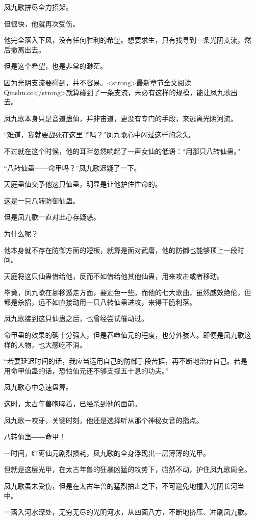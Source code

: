 \begin{this_body}
凤九歌拼尽全力招架。

但很快，他就再次受伤。

他完全落入下风，没有任何胜利的希望。想要求生，只有找寻到一条光阴支流，然后撤离出去。

但是这个希望，也是非常的渺茫。

因为光阴支流要碰到，并不容易。<strong>最新章节全文阅读Qiushu.cc</strong>就算碰到了一条支流，未必有这样的规模，能让凤九歌出去。

凤九歌本身只是音道蛊仙，并非宙道，更没有专门的手段，来逃离光阴河流。

“难道，我就要战死在这里了吗？”凤九歌心中闪过这样的念头。

不过就在这个时候，他的耳畔忽然响起了一声女仙的低语：“用那只八转仙蛊。”

“八转仙蛊――命甲吗？”凤九歌迟疑了一下。

天庭蛊仙交予他这只仙蛊，明显是让他护住性命的。

这是一只八转防御仙蛊。

但是凤九歌一直对此心存疑惑。

为什么呢？

他本身就不存在防御方面的短板，就算是面对武庸，他的防御也能够顶上一段时间。

天庭将这只仙蛊借给他，反而不如借给他其他仙蛊，用来攻击或者移动。

毕竟，凤九歌在挪移遁走方面，要逊色一些。而他的七大歌曲，虽然威效绝伦，但都是杀招，远不如直接动用一只八转仙蛊进攻，来得干脆利落。

凤九歌接到这只仙蛊之后，也曾经尝试催动过。

命甲蛊的效果的确十分强大，但是吞噬仙元的程度，也分外骇人。即便是凤九歌这样的人物，也大感吃不消。

“若要延迟时间的话，我应当运用自己的防御手段苦捱，再不断地治疗自己。若是用命甲仙蛊的话，恐怕仙元还不够支撑五十息的功夫。”

凤九歌心中急速盘算。

这时，太古年兽咆哮着，已经杀到他的面前。

凤九歌一咬牙，关键时刻，他还是选择听从那个神秘女音的指点。

八转仙蛊――命甲！

一时间，红枣仙元剧烈损耗，凤九歌的全身浮现出一层薄薄的光甲。

但就是这层光甲，在太古年兽的狂暴凶猛的攻势下，岿然不动，护住凤九歌周全。

凤九歌虽未受伤，但是在太古年兽的猛烈拍击之下，不可避免地撞入光阴长河当中。

一落入河水深处，无穷无尽的光阴河水，从四面八方，不断地挤压、冲刷凤九歌。


\end{this_body}
